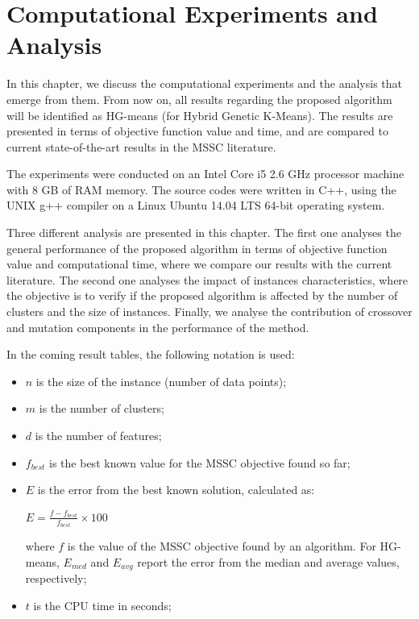 \chapter{Computational Experiments and Analysis}
\label{chap:experiments}
In this chapter, we discuss the computational experiments and the analysis that emerge from them. From now on, all results regarding the proposed algorithm will be identified as HG-means (for Hybrid Genetic K-Means). The results are presented in terms of objective function value and time, and are compared to current state-of-the-art results in the MSSC literature.

The experiments were conducted on an Intel Core i5 2.6 GHz processor machine with 8 GB of RAM memory. The source codes were written in C++, using the UNIX g++ compiler on a Linux Ubuntu 14.04 LTS 64-bit operating system.

Three different analysis are presented in this chapter. The first one analyses the general performance of the proposed algorithm in terms of objective function value and computational time, where we compare our results with the current literature. The second one analyses the impact of instances characteristics, where the objective is to verify if the proposed algorithm is affected by the number of clusters and the size of instances. Finally, we analyse the contribution of crossover and mutation components in the performance of the method.

In the coming result tables, the following notation is used:

\begin{itemize}
	\item $n$ is the size of the instance (number of data points);
	
	\item $m$ is the number of clusters;

	\item $d$ is the number of features;
	
	\item $f_{best}$ is the best known value for the MSSC objective found so far;

	\item $E$ is the error from the best known solution, calculated as:

		\begin{center}
		\large
			$E = \frac{f - f_{best}}{f_{best}} \times 100$
		\end{center}
		
	where $f$ is the value of the MSSC objective found by an algorithm. For HG-means, $E_{med}$ and $E_{avg}$ report the error from the median and average values, respectively;
	
	\item $t$ is the CPU time in seconds;
	

\end{itemize}

